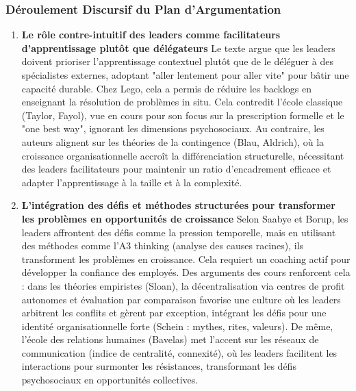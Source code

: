 \documentclass{rapportECL}
\begin{document}
\subsubsection{Déroulement Discursif du Plan d’Argumentation}
\begin{enumerate}
\item \textbf{Le rôle contre-intuitif des leaders comme facilitateurs d'apprentissage plutôt que délégateurs}  
Le texte argue que les leaders doivent prioriser l'apprentissage contextuel plutôt que de le déléguer à des spécialistes externes, adoptant "aller lentement pour aller vite" pour bâtir une capacité durable. Chez Lego, cela a permis de réduire les backlogs en enseignant la résolution de problèmes in situ. Cela contredit l'école classique (Taylor, Fayol), vue en cours pour son focus sur la prescription formelle et le "one best way", ignorant les dimensions psychosociaux. Au contraire, les auteurs alignent sur les théories de la contingence (Blau, Aldrich), où la croissance organisationnelle accroît la différenciation structurelle, nécessitant des leaders facilitateurs pour maintenir un ratio d'encadrement efficace et adapter l'apprentissage à la taille et à la complexité.

\item \textbf{L'intégration des défis et méthodes structurées pour transformer les problèmes en opportunités de croissance}  
Selon Saabye et Borup, les leaders affrontent des défis comme la pression temporelle, mais en utilisant des méthodes comme l'A3 thinking (analyse des causes racines), ils transforment les problèmes en croissance. Cela requiert un coaching actif pour développer la confiance des employés. Des arguments des cours renforcent cela : dans les théories empiristes (Sloan), la décentralisation via centres de profit autonomes et évaluation par comparaison favorise une culture où les leaders arbitrent les conflits et gèrent par exception, intégrant les défis pour une identité organisationnelle forte (Schein : mythes, rites, valeurs). De même, l'école des relations humaines (Bavelas) met l'accent sur les réseaux de communication (indice de centralité, connexité), où les leaders facilitent les interactions pour surmonter les résistances, transformant les défis psychosociaux en opportunités collectives.


\end{enumerate}
\end{document}
